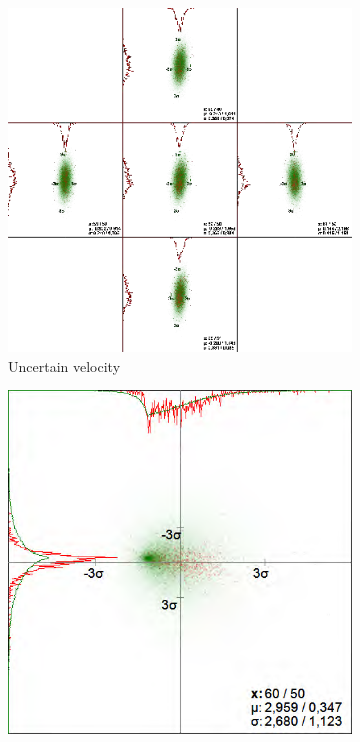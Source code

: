 \begin{figure}[t]
    \centering
    \begin{subfigure}{0.49\textwidth}
        \includegraphics[width=\textwidth]{Images/uncvelocity.png}
        \caption{Uncertain velocity}
        \label{fig:uncvel}
    \end{subfigure}
    \begin{subfigure}{0.49\textwidth}
        \includegraphics[width=\textwidth]{Images/uncacceleration.png}

\end{subfigure}
\end{figure}
